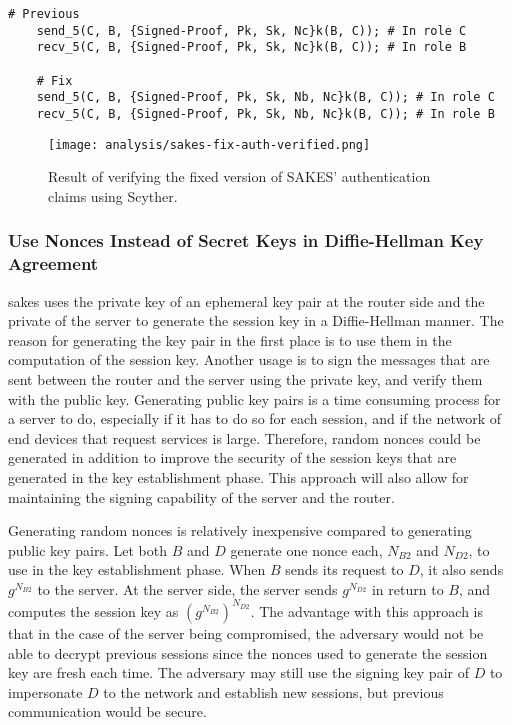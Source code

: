\begin{lstlisting}[caption={Fix to the SAKES protocol to provide non-injective synchronization and data agreement for the end router $B$ during the authentication phase.}, label={lst:fix-nisynch-b-auth}]
	# Previous
	send_5(C, B, {Signed-Proof, Pk, Sk, Nc}k(B, C)); # In role C
	recv_5(C, B, {Signed-Proof, Pk, Sk, Nc}k(B, C)); # In role B
	
	# Fix
	send_5(C, B, {Signed-Proof, Pk, Sk, Nb, Nc}k(B, C)); # In role C
	recv_5(C, B, {Signed-Proof, Pk, Sk, Nb, Nc}k(B, C)); # In role B
\end{lstlisting}
\newpage

\begin{figure}[H]
	\centering
	\texttt{[image: analysis/sakes-fix-auth-verified.png]}
	\caption{Result of verifying the fixed version of SAKES' authentication claims using Scyther.}
	\label{fig:sakes-fix-verified-auth}
\end{figure}



\subsubsection{Use Nonces Instead of Secret Keys in Diffie-Hellman Key Agreement}

\gls{sakes} uses the private key of an ephemeral key pair at the router side and the private of the server to generate the session key in a Diffie-Hellman manner. The reason for generating the key pair in the first place is to use them in the computation of the session key. Another usage is to sign the messages that are sent between the router and the server using the private key, and verify them with the public key. Generating public key pairs is a time consuming process for a server to do, especially if it has to do so for each session, and if the network of end devices that request services is large. Therefore, random nonces could be generated in addition to improve the security of the session keys that are generated in the key establishment phase. This approach will also allow for maintaining the signing capability of the server and the router.

Generating random nonces is relatively inexpensive compared to generating public key pairs. Let both $B$ and $D$ generate one nonce each, $N_{B2}$ and $N_{D2}$, to use in the key establishment phase. When $B$ sends its request to $D$, it also sends $g^{N_{B2}}$ to the server. At the server side, the server sends $g^{N_{D2}}$ in return to $B$, and computes the session key as $(g^{N_{B2}})^{N_{D2}}$. The advantage with this approach is that in the case of the server being compromised, the adversary would not be able to decrypt previous sessions since the nonces used to generate the session key are fresh each time. The adversary may still use the signing key pair of $D$ to impersonate $D$ to the network and establish new sessions, but previous communication would be secure.


